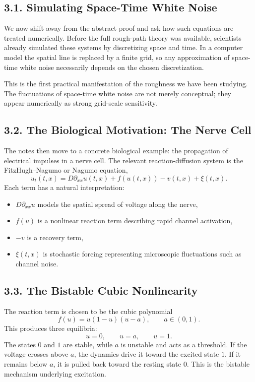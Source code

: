 \documentclass[11pt]{article}
\theoremstyle{definition}
\theoremstyle{remark}
\begin{document}
\subsection*{3.1. Simulating Space-Time White Noise}
We now shift away from the abstract proof and ask how such equations are treated numerically. Before the full rough-path theory was available, scientists already simulated these systems by discretizing space and time. In a computer model the spatial line is replaced by a finite grid, so any approximation of space-time white noise necessarily depends on the chosen discretization.

This is the first practical manifestation of the roughness we have been studying. The fluctuations of space-time white noise are not merely conceptual; they appear numerically as strong grid-scale sensitivity.

\subsection*{3.2. The Biological Motivation: The Nerve Cell}
The notes then move to a concrete biological example: the propagation of electrical impulses in a nerve cell. The relevant reaction-diffusion system is the FitzHugh--Nagumo or Nagumo equation,
\[
u_t(t,x)=D\partial_{xx}u(t,x)+f(u(t,x))-v(t,x)+\xi(t,x).
\]
Each term has a natural interpretation:
\begin{itemize}
\item \(D\partial_{xx}u\) models the spatial spread of voltage along the nerve,
\item \(f(u)\) is a nonlinear reaction term describing rapid channel activation,
\item \(-v\) is a recovery term,
\item \(\xi(t,x)\) is stochastic forcing representing microscopic fluctuations such as channel noise.
\end{itemize}

\subsection*{3.3. The Bistable Cubic Nonlinearity}
The reaction term is chosen to be the cubic polynomial
\[
f(u)=u(1-u)(u-a),
\qquad a\in(0,1).
\]
This produces three equilibria:
\[
u=0,\qquad u=a,\qquad u=1.
\]
The states \(0\) and \(1\) are stable, while \(a\) is unstable and acts as a threshold. If the voltage crosses above \(a\), the dynamics drive it toward the excited state \(1\). If it remains below \(a\), it is pulled back toward the resting state \(0\). This is the bistable mechanism underlying excitation.
\end{document}
